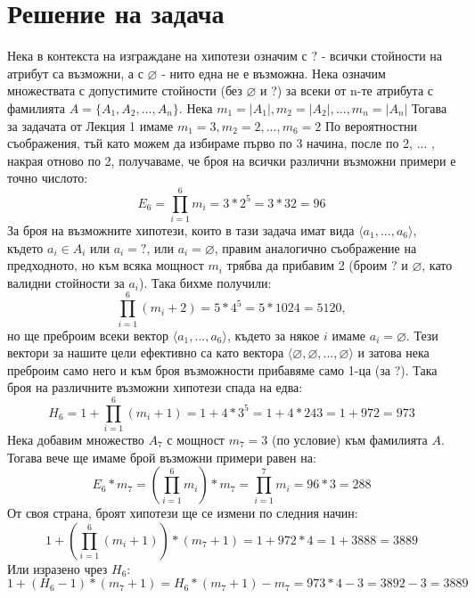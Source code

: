 \documentclass[12pt]{article}
\begin{document}
	
	
	\tableofcontents
	
	
	
	\newpage
	
	\section{Решение на задача }
	
	Нека в контекста на изграждане на хипотези означим с $?$ - всички стойности на атрибут са възможни, а с $\varnothing$ - нито една не е възможна.\newline\newline
	Нека означим множествата с допустимите стойности (без $\varnothing$ и ?) за всеки от n-те атрибута с фамилията $ A = \{ A_{1}, A_{2}, ... ,  A_{n} \}$.\newline\newline
	Нека $m_{1} = |A_{1}|, m_{2} = |A_{2}|, ... , m_{n} = |A_{n}|$\newline\newline
	Тогава за задачата от Лекция 1 имаме $m_{1} = 3, m_{2} = 2, ..., m_{6} = 2$\newline\newline
	По вероятностни съображения, тъй като можем да избираме първо по 3 начина, после по 2, ... , накрая отново по 2, получаваме, че броя на всички различни възможни примери е точно числото:
	\[E_{6} = \displaystyle \prod_{i = 1}^6 m_{i} = 3 * 2^{5} = 3 * 32 = 96\]
	За броя на възможните хипотези, които в тази задача имат вида $\langle a_{1},...,a_{6} \rangle$, където $a_{i} \in A_{i}$ или $a_{i}=?$, или $a_{i}=\varnothing$, правим аналогично съображение на предходното, но към всяка мощност $m_{i}$ трябва да прибавим 2 (броим ? и $\varnothing$, като валидни стойности за $a_{i}$). Така бихме получили: \[\displaystyle \prod_{i = 1}^6(m_{i}+2) = 5*4^{5} = 5 * 1024 = 5120,\] но ще преброим всеки вектор $\langle a_{1},...,a_{6} \rangle$, където за някое $i$ имаме $a_{i} = \varnothing$. \newline Тези вектори за нашите цели ефективно са като вектора $\langle\varnothing, \varnothing,..., \varnothing\rangle$ и затова нека преброим само него и към броя възможности прибавяме само 1-ца (за $?$). Така броя на различните възможни хипотези спада на едва: \[H_{6} = 1 + \displaystyle \prod_{i = 1}^6(m_{i}+1) = 1 + 4*3^{5} = 1 + 4*243 = 1+ 972 = 973\]\newline\newline
	Нека добавим множество $A_{7}$ с мощност $m_{7}=3$ (по условие) към фамилията $A$. Тогава вече ще имаме брой възможни примери равен на: \[E_{6}*m_{7} = (\displaystyle \prod_{i = 1}^6 m_{i})*m_{7} = \displaystyle \prod_{i = 1}^7 m_{i} = 96*3 = 288\] От своя страна, броят хипотези ще се измени по следния начин: \[1 + (\displaystyle \prod_{i = 1}^6 (m_{i}+1))*(m_{7}+1) = 1 + 972*4 = 1 + 3888 = 3889\] Или изразено чрез $H_{6}$: \[1 + (H_{6} -  1) * (m_{7}+1) = H_{6} * (m_{7}+1) - m_{7} = 973*4 - 3 = 3892 - 3 = 3889\]\newline\newline
\end{document}
